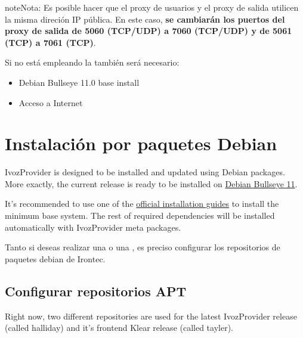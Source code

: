 \documentclass[letterpaper,10pt,spanish]{sphinxmanual}
\begin{document}
\begin{notice}{note}{Nota:}
Es posible hacer que el proxy de usuarios y el proxy de salida utilicen la misma direción IP pública. En este caso, \textbf{se cambiarán los puertos del proxy de salida de 5060 (TCP/UDP) a 7060 (TCP/UDP) y de 5061 (TCP) a 7061 (TCP)}.
\end{notice}

Si no está empleando la {\hyperref[basic_concepts/installation/cd_install:cds\string-automaticos\string-de\string-instalacion]{}} también será necesario:
\begin{itemize}
\item {} 
Debian Bullseye 11.0 base install

\item {} 
Acceso a Internet

\end{itemize}


\section{Instalación por paquetes Debian}
\label{basic_concepts/installation/debian_install::doc}\label{basic_concepts/installation/debian_install:debian-packages-install}
IvozProvider is designed to be installed and updated using Debian packages.
More exactly, the current release is ready to be installed on
\href{https://www.debian.org/releases/bullseye}{Debian Bullseye 11}.

It's recommended to use one of the \href{https://www.debian.org/releases/bullseye/installmanual}{official installation guides} to install the minimum
base system. The rest of required  dependencies will be installed automatically
with IvozProvider meta packages.

Tanto si deseas realizar una {\hyperref[basic_concepts/installation/install_types:instalacion\string-standalone]{}} o una {\hyperref[basic_concepts/installation/install_types:instalacion\string-distribuida]{}}, es preciso configurar los repositorios de paquetes debian de Irontec.


\subsection{Configurar repositorios APT}
\label{basic_concepts/installation/debian_install:apt-repository-configuration}
Right now, two different repositories are used for the latest IvozProvider
release (called halliday) and it's frontend Klear release (called tayler).
\end{document}
